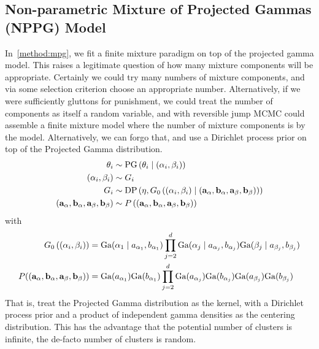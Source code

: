 \subsection{Non-parametric Mixture of Projected Gammas (NPPG) Model}
\label{method:nppg}
In~\ref{method:mpg}, we fit a finite mixture paradigm on top of the projected
gamma model.  This raises a legitimate question of how many mixture components
will be appropriate.  Certainly we could try many numbers of mixture components,
and via some selection criterion choose an appropriate number.  Alternatively, if
we were sufficiently gluttons for punishment, we could treat the number of
components as itself a random variable, and with reversible jump MCMC could
assemble a finite mixture model where the number of mixture components is
by the model.  Alternatively, we can forgo that, and use a Dirichlet process
prior on top of the Projected Gamma distribution.
\begin{equation}
  \label{eqn:nppg}
  \begin{aligned}
    \theta_i &\sim \text{PG}\left(\theta_i\mid ({\bf \alpha}_i, {\bf \beta}_i) \right)\\
    ({\bf \alpha}_i, {\bf \beta}_i) &\sim G_i\\
    G_i &\sim \text{DP}\left(\eta, G_0\left(({\bf \alpha}_i, {\bf \beta}_i)\mid ({\bf a}_{\alpha}, {\bf b}_{\alpha}, {\bf a}_{\beta}, {\bf b}_{\beta}) \right)\right)\\
     ({\bf a}_{\alpha}, {\bf b}_{\alpha}, {\bf a}_{\beta}, {\bf b}_{\beta}) &\sim P\left(({\bf a}_{\alpha}, {\bf b}_{\alpha}, {\bf a}_{\beta}, {\bf b}_{\beta})\right)
  \end{aligned}
\end{equation}
with 
\begin{equation*}
    \begin{aligned}
    G_0\left(({\bf \alpha}_i, {\bf \beta}_i)\right) &= \text{Ga}(\alpha_1\mid a_{\alpha_1},b_{\alpha_1})\prod_{j = 2}^d\text{Ga}(\alpha_j\mid a_{\alpha_j}, b_{\alpha_j})\text{Ga}(\beta_j\mid a_{\beta_j}, b_{\beta_j})\\
    P(({\bf a}_{\alpha}, {\bf b}_{\alpha}, {\bf a}_{\beta}, {\bf b}_{\beta})) &= \text{Ga}(a_{\alpha_1})\text{Ga}(b_{\alpha_1})\prod_{j = 2}^d\text{Ga}(a_{\alpha_j})\text{Ga}(b_{\alpha_j})\text{Ga}(a_{\beta_j})\text{Ga}(b_{\beta_j})
    \end{aligned}
\end{equation*}
That is, treat the Projected Gamma distribution as the kernel, with a
  Dirichlet process prior and a product of independent gamma densities as the
  centering distribution.  This has the advantage that the potential number of
  clusters is infinite, the de-facto number of clusters is random.

